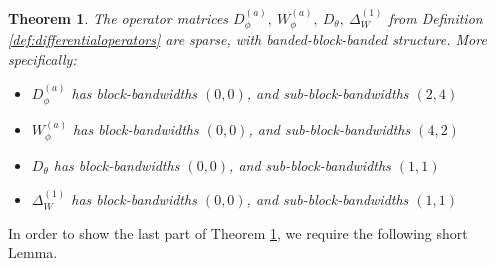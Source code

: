 \documentclass[11pt, oneside]{article}   	%
\newtheorem{theorem}{Theorem}
\begin{document}
\begin{theorem}\label{theorem:sparsityofdifferentialoperators}
The operator matrices $D_\phi^{(a)}, \: W_\phi^{(a)}, \: D_\theta, \: \Delta^{(1)}_W$ from Definition \ref{def:differentialoperators} are sparse, with banded-block-banded structure. More specifically:
\begin{itemize}
	\item $D_\phi^{(a)}$ has block-bandwidths $(0,0)$, and sub-block-bandwidths $(2, 4)$
  	\item $W_\phi^{(a)}$ has block-bandwidths $(0,0)$, and sub-block-bandwidths $(4, 2)$
	\item $D_\theta$ has  block-bandwidths $(0,0)$, and sub-block-bandwidths $(1, 1)$
	\item $\Delta^{(1)}_W$ has block-bandwidths $(0,0)$, and sub-block-bandwidths $(1, 1)$
\end{itemize}
\end{theorem}

In order to show the last part of Theorem \ref{theorem:sparsityofdifferentialoperators}, we require the following short Lemma.
\end{document}
